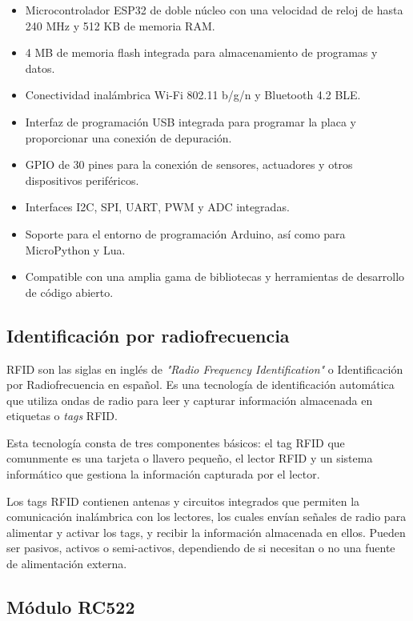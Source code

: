 \begin{itemize}
\item Microcontrolador ESP32 de doble núcleo con una velocidad de reloj de hasta 240 MHz y 512 KB de memoria RAM.
\item 4 MB de memoria flash integrada para almacenamiento de programas y datos.
\item Conectividad inalámbrica Wi-Fi 802.11 b/g/n y Bluetooth 4.2 BLE.
\item Interfaz de programación USB integrada para programar la placa y proporcionar una conexión de depuración.
\item GPIO de 30 pines para la conexión de sensores, actuadores y otros dispositivos periféricos.
\item Interfaces I2C, SPI, UART, PWM y ADC integradas.
\item Soporte para el entorno de programación Arduino, así como para MicroPython y Lua.
\item Compatible con una amplia gama de bibliotecas y herramientas de desarrollo de código abierto.
\end{itemize}

\subsection{Identificación por radiofrecuencia}
\label{subsec:rfid}

RFID \cite{RFID} son las siglas en inglés de \textit{"Radio Frequency Identification"} o Identificación por Radiofrecuencia en español. Es una tecnología de identificación automática que utiliza ondas de radio para leer y capturar información almacenada en etiquetas o \textit{tags} RFID.

Esta tecnología consta de tres componentes básicos: el tag RFID que comunmente es una tarjeta o llavero pequeño, el lector RFID y un sistema informático que gestiona la información capturada por el lector. 

Los tags RFID contienen antenas y circuitos integrados que permiten la comunicación inalámbrica con los lectores, los cuales envían señales de radio para alimentar y activar los tags, y recibir la información almacenada en ellos. Pueden ser pasivos, activos o semi-activos, dependiendo de si necesitan o no una fuente de alimentación externa. 


\subsection{Módulo RC522}
\label{subsec:rc522}


